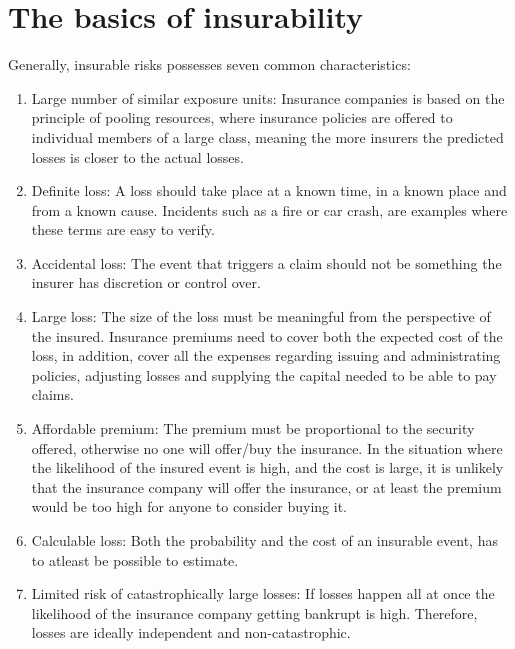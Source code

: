 \section{The basics of insurability}

 Generally, insurable risks possesses seven common characteristics: \cite{mehr1980principles}
   \begin{enumerate}
   \item Large number of similar exposure units: Insurance companies is based on the principle of
    pooling resources, where insurance policies are offered to individual members of a large class,
     meaning the more insurers the predicted losses is closer to the actual losses. 
   \item Definite loss: A loss should take place at a known time, in a known place and from a known
    cause. Incidents such as a fire or car crash, are examples where these terms are easy to verify.
   \item Accidental loss: The event that triggers a claim should not be 
   something the insurer has discretion or control over.
   \item Large loss: The size of the loss must be meaningful from the perspective of the insured.
    Insurance premiums need to cover both the expected cost of the loss, in addition, 
    cover all the expenses regarding issuing and administrating policies, adjusting losses and
     supplying the capital needed to be able to pay claims.
   \item Affordable premium: The premium must be proportional to the security offered, otherwise no
    one will offer/buy the insurance. In the situation where the likelihood of the insured event is
     high, and the cost is large, it is unlikely that the insurance company will offer the insurance,
      or at least the premium would be too high for anyone to consider buying it. 
   \item Calculable loss: Both the probability and the cost of an insurable event,
    has to atleast be possible to estimate. 
   \item Limited risk of catastrophically large losses: If losses happen all at once the likelihood of
    the insurance company getting bankrupt is high. Therefore, losses are ideally independent and non-catastrophic. 
   \end{enumerate}
    
